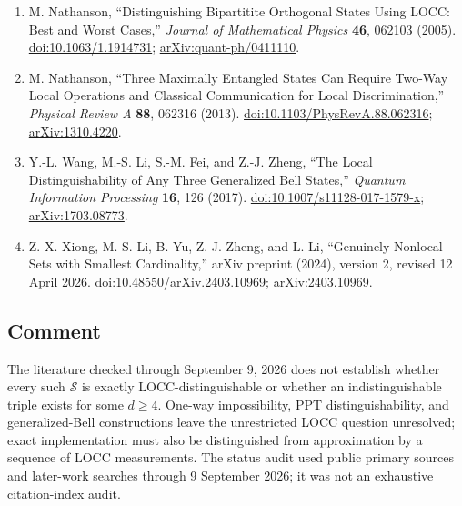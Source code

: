 \begin{enumerate}[label={},leftmargin=4.8em,labelsep=0.5em]
  \footnotesize
  \item[\textup{[Nat05]}]\label{ref:mes-qutrit}
  M. Nathanson, ``Distinguishing Bipartitite Orthogonal States Using LOCC: Best and Worst Cases,'' \emph{Journal of Mathematical Physics} \textbf{46}, 062103 (2005). \href{https://doi.org/10.1063/1.1914731}{doi:10.1063/1.1914731}; \href{https://arxiv.org/abs/quant-ph/0411110}{arXiv:quant-ph/0411110}.

  \item[\textup{[Nat13]}]\label{ref:mes-two-way}
  M. Nathanson, ``Three Maximally Entangled States Can Require Two-Way Local Operations and Classical Communication for Local Discrimination,'' \emph{Physical Review A} \textbf{88}, 062316 (2013). \href{https://doi.org/10.1103/PhysRevA.88.062316}{doi:10.1103/PhysRevA.88.062316}; \href{https://arxiv.org/abs/1310.4220}{arXiv:1310.4220}.

  \item[\textup{[WLFZ17]}]\label{ref:mes-bell}
  Y.-L. Wang, M.-S. Li, S.-M. Fei, and Z.-J. Zheng, ``The Local Distinguishability of Any Three Generalized Bell States,'' \emph{Quantum Information Processing} \textbf{16}, 126 (2017). \href{https://doi.org/10.1007/s11128-017-1579-x}{doi:10.1007/s11128-017-1579-x}; \href{https://arxiv.org/abs/1703.08773}{arXiv:1703.08773}.

  \item[\textup{[XLY+24]}]\label{ref:mes-recent}
  Z.-X. Xiong, M.-S. Li, B. Yu, Z.-J. Zheng, and L. Li, ``Genuinely Nonlocal Sets with Smallest Cardinality,'' arXiv preprint (2024), version 2, revised 12 April 2026. \href{https://doi.org/10.48550/arXiv.2403.10969}{doi:10.48550/arXiv.2403.10969}; \href{https://arxiv.org/abs/2403.10969}{arXiv:2403.10969}.
\end{enumerate}

\subsection*{Comment}

The literature checked through September 9, 2026 does not establish whether every such $\mathcal S$ is exactly LOCC-distinguishable or whether an indistinguishable triple exists for some $d\geq4$. One-way impossibility, PPT distinguishability, and generalized-Bell constructions leave the unrestricted LOCC question unresolved; exact implementation must also be distinguished from approximation by a sequence of LOCC measurements. The status audit used public primary sources and later-work searches through 9 September 2026; it was not an exhaustive citation-index audit.

